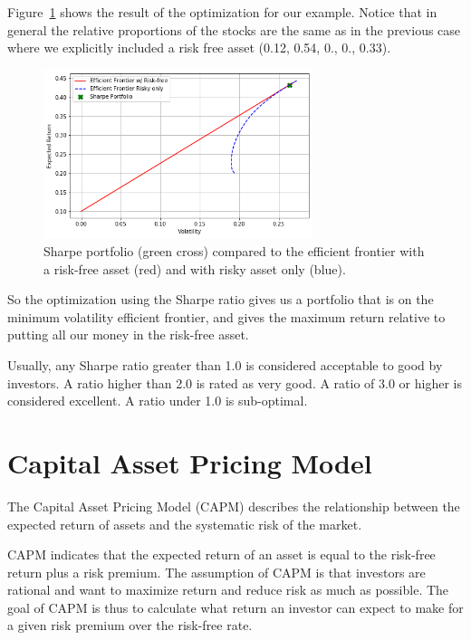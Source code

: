 Figure~\ref{fig:sharpe_ratio} shows the result of the optimization for our example.    
Notice that in general the relative proportions of the stocks are the
same as in the previous case where we explicitly included a risk free
asset (0.12, 0.54, 0., 0., 0.33).

\begin{figure}[htb]
	\centering
	\includegraphics[width=0.7\textwidth]{figures/sharpe_ratio.png}
	\caption{Sharpe portfolio (green cross) compared to the efficient frontier with a risk-free asset (red) and with risky asset only (blue).}
	\label{fig:sharpe_ratio}
\end{figure}

So the optimization using the Sharpe ratio gives us a portfolio that is
on the minimum volatility efficient frontier, and gives the maximum
return relative to putting all our money in the risk-free asset.

Usually, any Sharpe ratio greater than 1.0 is considered acceptable to good by investors. A ratio higher than 2.0 is rated as very good. A ratio of 3.0 or higher is considered excellent. A ratio under 1.0 is sub-optimal.

\section{Capital Asset Pricing Model}
The Capital Asset Pricing Model (CAPM) describes the relationship between the expected return of assets and the systematic risk of the market.

CAPM indicates that the expected return of an asset is equal to the risk-free return plus a risk premium. The assumption of CAPM is that investors are rational and want to maximize return and reduce risk as much as possible. The goal of CAPM is thus to calculate what return an investor can expect to make for a given risk premium over the risk-free rate.

